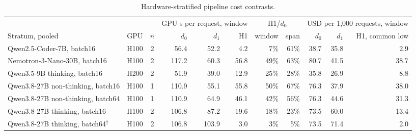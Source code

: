 
\begin{table}[t]
\caption{Hardware-stratified pipeline cost contrasts.}
\label{tab:h1}
\centering\small
\begin{tabular}{llcrrrrrrrr}
\toprule
 & & & \multicolumn{3}{c}{GPU s per request, window} & \multicolumn{2}{c}{H1/$d_0$} & \multicolumn{3}{c}{USD per 1,000 requests, window} \\
\cmidrule(lr){4-6}\cmidrule(lr){7-8}\cmidrule(lr){9-11}
Stratum, pooled & GPU & $n$ & $d_0$ & $d_1$ & H1 & window & span & $d_0$ & $d_1$ & H1, common low \\
\midrule
Qwen2.5-Coder-7B, batch16 & H100 & 2 & 56.4 & 52.2 & 4.2 & 7\% & 61\% & 38.7 & 35.8 & 2.9 \\
Nemotron-3-Nano-30B, batch16 & H100 & 2 & 117.2 & 60.3 & 56.8 & 49\% & 63\% & 80.7 & 41.5 & 38.7 \\
Qwen3.5-9B thinking, batch16 & H200 & 2 & 51.9 & 39.0 & 12.9 & 25\% & 28\% & 35.8 & 26.9 & 8.8 \\
Qwen3.8-27B non-thinking, batch16 & H100 & 1 & 110.9 & 55.1 & 55.8 & 50\% & 67\% & 76.3 & 37.9 & 38.0 \\
Qwen3.8-27B non-thinking, batch64 & H100 & 1 & 110.9 & 64.9 & 46.1 & 42\% & 56\% & 76.3 & 44.6 & 31.3 \\
Qwen3.8-27B thinking, batch16 & H100 & 2 & 106.8 & 87.2 & 19.6 & 18\% & 23\% & 73.5 & 60.0 & 13.4 \\
Qwen3.8-27B thinking, batch64$^\dagger$ & H100 & 2 & 106.8 & 103.9 & 3.0 & 3\% & 5\% & 73.5 & 71.4 & 2.0 \\
\bottomrule
\end{tabular}
\end{table}
